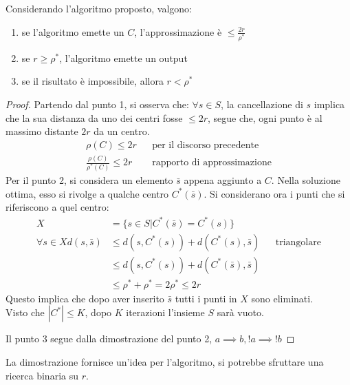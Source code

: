 \begin{theorem}
    Considerando l'algoritmo proposto, valgono:
    \begin{enumerate}
        \item se l'algoritmo emette un $C$, l'approssimazione è $\leq \frac{2r}{\rho^*}$
        \item se $r \geq \rho^*$, l'algoritmo emette un output
        \item se il risultato è impossibile, allora $r < \rho^*$
    \end{enumerate}
\end{theorem}
\begin{proof}
    Partendo dal punto 1, si osserva che: $\forall s \in S$, la cancellazione
    di $s$ implica che la sua distanza da uno dei centri fosse $\leq 2r$, segue che, 
    ogni punto è al massimo distante $2r$ da un centro.
    \begin{equation}
        \begin{aligned}
            \rho(C) \leq 2r && \text{per il discorso precedente}\\
            \frac{\rho(C)}{\rho^*(C)} \leq 2r && \text{rapporto di approssimazione}
        \end{aligned}
    \end{equation}
    Per il punto 2, si considera un elemento $\bar{s}$ appena aggiunto a $C$.
    Nella soluzione ottima, esso si rivolge a qualche centro $C^*(\bar{s})$.
    Si considerano ora i punti che si riferiscono a quel centro: 
    \begin{equation}
        \begin{aligned}
            X &= \{ s \in S | C^*(\bar{s}) = C^*(s)\}\\
            \forall s \in X
            d(s, \bar{s}) &\leq d(s, C^*(s)) + d(C^*(s), \bar{s}) && \text{triangolare}\\
            &\leq d(s, C^*(s)) + d(C^*(\bar{s}), \bar{s})\\
            &\leq \rho^* + \rho^* = 2 \rho^* \leq 2r
        \end{aligned}
    \end{equation}
    Questo implica che dopo aver inserito $\bar{s}$ tutti i punti in $X$ sono eliminati.\\
    Visto che $|C^*| \leq K$, dopo $K$ iterazioni l'insieme $S$ sarà vuoto.  

    Il punto 3 segue dalla dimostrazione del punto 2, $a \implies b, !a \implies !b$
\end{proof}
\begin{remark}
    La dimostrazione fornisce un'idea per l'algoritmo, si potrebbe sfruttare una 
    ricerca binaria su $r$.
\end{remark}

